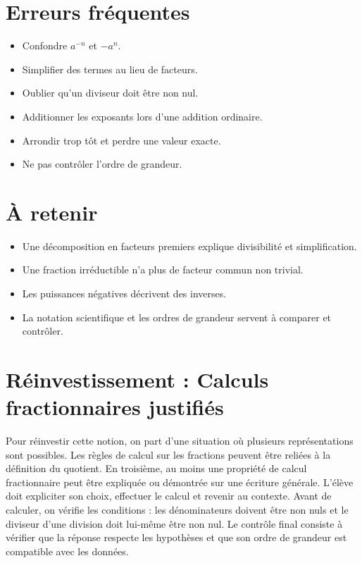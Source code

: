 \section{Erreurs fréquentes}
\begin{itemize}
\item Confondre $a^{-n}$ et $-a^n$.
\item Simplifier des termes au lieu de facteurs.
\item Oublier qu’un diviseur doit être non nul.
\item Additionner les exposants lors d’une addition ordinaire.
\item Arrondir trop tôt et perdre une valeur exacte.
\item Ne pas contrôler l’ordre de grandeur.
\end{itemize}

\section{À retenir}
\begin{aretenir}
\begin{itemize}
\item Une décomposition en facteurs premiers explique divisibilité et simplification.
\item Une fraction irréductible n’a plus de facteur commun non trivial.
\item Les puissances négatives décrivent des inverses.
\item La notation scientifique et les ordres de grandeur servent à comparer et contrôler.
\end{itemize}
\end{aretenir}

\section{Réinvestissement : Calculs fractionnaires justifiés}
Pour réinvestir cette notion, on part d’une situation où plusieurs représentations sont possibles. Les règles de calcul sur les fractions peuvent être reliées à la définition du quotient. En troisième, au moins une propriété de calcul fractionnaire peut être expliquée ou démontrée sur une écriture générale. L’élève doit expliciter son choix, effectuer le calcul et revenir au contexte. Avant de calculer, on vérifie les conditions : les dénominateurs doivent être non nuls et le diviseur d’une division doit lui-même être non nul. Le contrôle final consiste à vérifier que la réponse respecte les hypothèses et que son ordre de grandeur est compatible avec les données.
